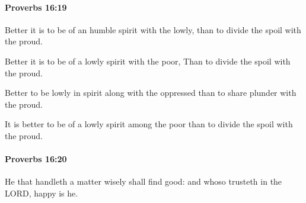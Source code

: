 		\paragraph{Proverbs 16:19} %
			\label{PROVERBS-16-19}

			Better it is to be of an humble spirit with the lowly, than to divide the spoil with the proud.

			\begin{versebox}
					\item[BHS] 
					\item[ASV] Better it is to be of a lowly spirit with the poor, Than to divide the spoil with the proud.
					\item[NIV] Better to be lowly in spirit along with the oppressed than to share plunder with the proud.
					\item[NRSV] It is better to be of a lowly spirit among the poor than to divide the spoil with the proud.
			\end{versebox}

		\paragraph{Proverbs 16:20} %
			\label{PROVERBS-16-20}

			He that handleth a matter wisely shall find good: and whoso trusteth in the LORD, happy is he.

